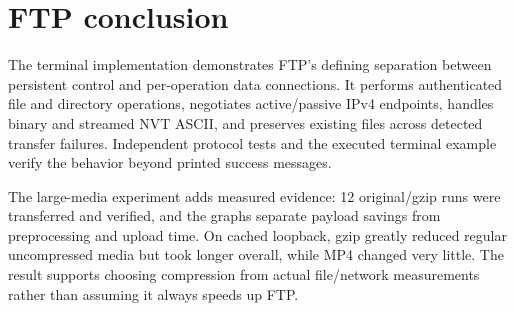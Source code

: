 \section{FTP conclusion}\label{sec:ftp-conclusion}
The terminal implementation demonstrates FTP's defining separation between persistent control and per-operation data connections. It performs authenticated file and directory operations, negotiates active/passive IPv4 endpoints, handles binary and streamed NVT ASCII, and preserves existing files across detected transfer failures. Independent protocol tests and the executed terminal example verify the behavior beyond printed success messages.

The large-media experiment adds measured evidence: 12 original/gzip runs were transferred and verified, and the graphs separate payload savings from preprocessing and upload time. On cached loopback, gzip greatly reduced regular uncompressed media but took longer overall, while MP4 changed very little. The result supports choosing compression from actual file/network measurements rather than assuming it always speeds up FTP.
